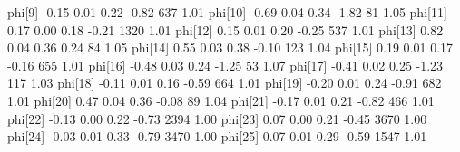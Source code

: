 \documentclass[]{tufte-handout}
\newenvironment{Shaded}{}{}
\newcommand{\DecValTok}[1]{\textcolor[rgb]{0.25,0.63,0.44}{#1}}
\newcommand{\FloatTok}[1]{\textcolor[rgb]{0.25,0.63,0.44}{#1}}
\newcommand{\NormalTok}[1]{#1}
\begin{document}
\begin{Shaded}
\begin{Highlighting}[]
{\NormalTok{phi[}\DecValTok{9}\NormalTok{]     }\FloatTok{-0.15}    \FloatTok{0.01}  \FloatTok{0.22}    \FloatTok{-0.82}   \DecValTok{637} \FloatTok{1.01}
\NormalTok{phi[}\DecValTok{10}\NormalTok{]    }\FloatTok{-0.69}    \FloatTok{0.04}  \FloatTok{0.34}    \FloatTok{-1.82}    \DecValTok{81} \FloatTok{1.05}
\NormalTok{phi[}\DecValTok{11}\NormalTok{]     }\FloatTok{0.17}    \FloatTok{0.00}  \FloatTok{0.18}    \FloatTok{-0.21}  \DecValTok{1320} \FloatTok{1.01}
\NormalTok{phi[}\DecValTok{12}\NormalTok{]     }\FloatTok{0.15}    \FloatTok{0.01}  \FloatTok{0.20}    \FloatTok{-0.25}   \DecValTok{537} \FloatTok{1.01}
\NormalTok{phi[}\DecValTok{13}\NormalTok{]     }\FloatTok{0.82}    \FloatTok{0.04}  \FloatTok{0.36}     \FloatTok{0.24}    \DecValTok{84} \FloatTok{1.05}
\NormalTok{phi[}\DecValTok{14}\NormalTok{]     }\FloatTok{0.55}    \FloatTok{0.03}  \FloatTok{0.38}    \FloatTok{-0.10}   \DecValTok{123} \FloatTok{1.04}
\NormalTok{phi[}\DecValTok{15}\NormalTok{]     }\FloatTok{0.19}    \FloatTok{0.01}  \FloatTok{0.17}    \FloatTok{-0.16}   \DecValTok{655} \FloatTok{1.01}
\NormalTok{phi[}\DecValTok{16}\NormalTok{]    }\FloatTok{-0.48}    \FloatTok{0.03}  \FloatTok{0.24}    \FloatTok{-1.25}    \DecValTok{53} \FloatTok{1.07}
\NormalTok{phi[}\DecValTok{17}\NormalTok{]    }\FloatTok{-0.41}    \FloatTok{0.02}  \FloatTok{0.25}    \FloatTok{-1.23}   \DecValTok{117} \FloatTok{1.03}
\NormalTok{phi[}\DecValTok{18}\NormalTok{]    }\FloatTok{-0.11}    \FloatTok{0.01}  \FloatTok{0.16}    \FloatTok{-0.59}   \DecValTok{664} \FloatTok{1.01}
\NormalTok{phi[}\DecValTok{19}\NormalTok{]    }\FloatTok{-0.20}    \FloatTok{0.01}  \FloatTok{0.24}    \FloatTok{-0.91}   \DecValTok{682} \FloatTok{1.01}
\NormalTok{phi[}\DecValTok{20}\NormalTok{]     }\FloatTok{0.47}    \FloatTok{0.04}  \FloatTok{0.36}    \FloatTok{-0.08}    \DecValTok{89} \FloatTok{1.04}
\NormalTok{phi[}\DecValTok{21}\NormalTok{]    }\FloatTok{-0.17}    \FloatTok{0.01}  \FloatTok{0.21}    \FloatTok{-0.82}   \DecValTok{466} \FloatTok{1.01}
\NormalTok{phi[}\DecValTok{22}\NormalTok{]    }\FloatTok{-0.13}    \FloatTok{0.00}  \FloatTok{0.22}    \FloatTok{-0.73}  \DecValTok{2394} \FloatTok{1.00}
\NormalTok{phi[}\DecValTok{23}\NormalTok{]     }\FloatTok{0.07}    \FloatTok{0.00}  \FloatTok{0.21}    \FloatTok{-0.45}  \DecValTok{3670} \FloatTok{1.00}
\NormalTok{phi[}\DecValTok{24}\NormalTok{]    }\FloatTok{-0.03}    \FloatTok{0.01}  \FloatTok{0.33}    \FloatTok{-0.79}  \DecValTok{3470} \FloatTok{1.00}
\NormalTok{phi[}\DecValTok{25}\NormalTok{]     }\FloatTok{0.07}    \FloatTok{0.01}  \FloatTok{0.29}    \FloatTok{-0.59}  \DecValTok{1547} \FloatTok{1.01}
}
\end{Highlighting}
\end{Shaded}
\end{document}
